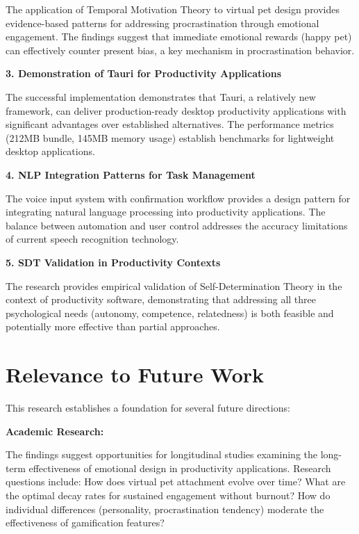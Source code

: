 The application of Temporal Motivation Theory to virtual pet design provides evidence-based patterns for addressing procrastination through emotional engagement. The findings suggest that immediate emotional rewards (happy pet) can effectively counter present bias, a key mechanism in procrastination behavior.

\textbf{3. Demonstration of Tauri for Productivity Applications}

The successful implementation demonstrates that Tauri, a relatively new framework, can deliver production-ready desktop productivity applications with significant advantages over established alternatives. The performance metrics (212MB bundle, 145MB memory usage) establish benchmarks for lightweight desktop applications.

\textbf{4. NLP Integration Patterns for Task Management}

The voice input system with confirmation workflow provides a design pattern for integrating natural language processing into productivity applications. The balance between automation and user control addresses the accuracy limitations of current speech recognition technology.

\textbf{5. SDT Validation in Productivity Contexts}

The research provides empirical validation of Self-Determination Theory in the context of productivity software, demonstrating that addressing all three psychological needs (autonomy, competence, relatedness) is both feasible and potentially more effective than partial approaches.

\section{Relevance to Future Work}
\label{sec:future-relevance}

\completed

This research establishes a foundation for several future directions:

\textbf{Academic Research:}

The findings suggest opportunities for longitudinal studies examining the long-term effectiveness of emotional design in productivity applications. Research questions include: How does virtual pet attachment evolve over time? What are the optimal decay rates for sustained engagement without burnout? How do individual differences (personality, procrastination tendency) moderate the effectiveness of gamification features?

